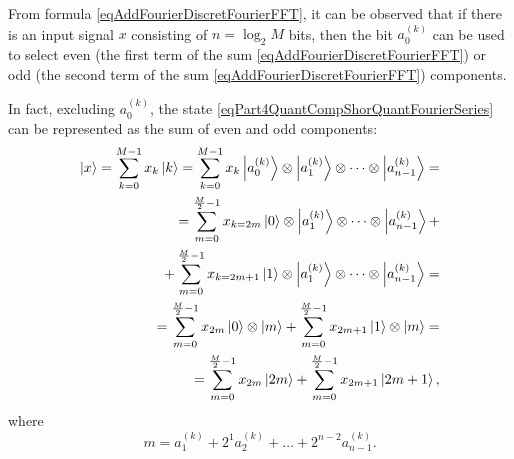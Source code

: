 From formula \eqref{eqAddFourierDiscretFourierFFT}, it can be observed that if there is an input signal $x$ consisting of $n = \log_2{M}$ bits, then the bit $a^{(k)}_0$ can be used to select even (the first term of the sum \eqref{eqAddFourierDiscretFourierFFT}) or odd (the second term of the sum \eqref{eqAddFourierDiscretFourierFFT}) components.

In fact, excluding $a^{(k)}_0$, the state \eqref{eqPart4QuantCompShorQuantFourierSeries} can be represented as the sum of even and odd components: 
\begin{eqnarray}
\ket{x} = \sum_{k = 0}^{M - 1}x_k \ket{k} = 
\sum_{k = 0}^{M - 1}x_k \ket{a^{(k)}_0} \otimes  \ket{a^{(k)}_1} \otimes \cdots \otimes \ket{a^{(k)}_{n-1}} = 
\nonumber \\
 = \sum_{m = 0}^{\frac{M}{2} - 1}x_{k=2m} \ket{0} \otimes  \ket{a^{(k)}_1} \otimes \cdots \otimes \ket{a^{(k)}_{n-1}} +
\nonumber \\
+
\sum_{m = 0}^{\frac{M}{2} - 1}x_{k=2m + 1} \ket{1} \otimes  \ket{a^{(k)}_1} \otimes \cdots \otimes \ket{a^{(k)}_{n-1}} = 
\nonumber \\
 = \sum_{m = 0}^{\frac{M}{2} - 1}x_{2m} \ket{0} \otimes  \ket{m} +
\sum_{m = 0}^{\frac{M}{2} - 1}x_{2m + 1} \ket{1} \otimes  \ket{m} = 
\nonumber \\
= \sum_{m = 0}^{\frac{M}{2} - 1}x_{2m} \ket{2m} +
\sum_{m = 0}^{\frac{M}{2} - 1}x_{2m + 1} \ket{2m+1},
\nonumber
\end{eqnarray}
where
\begin{equation}
m = a^{(k)}_1 + 2^1 a^{(k)}_2 + \dots + 2^{n-2} a^{(k)}_{n-1}.
\nonumber
\end{equation}



